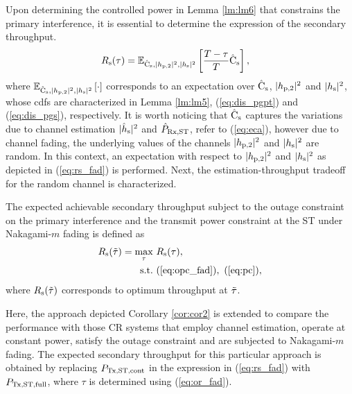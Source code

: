 Upon determining the controlled power in Lemma \ref{lm:lm6} that constrains the primary interference, it is essential to determine the expression of the secondary throughput.
\begin{align}
R_{\text{s}}(\tau) &= {\mathbb E}_{\hat{\text{{C}}}_{\text{s}}, |h_{\text{p,2}}|^2, |h_{\text{s}}|^2}\left[ \frac{T - \tau}{T} \hat{\text{{C}}}_{\text{s}}  \right], \label{eq:rs_fad} 
\end{align} 
where ${\mathbb E}_{\hat{\text{{C}}}_{\text{s}}, |h_{\text{p,2}}|^2, |h_{\text{s}}|^2}\left[ \cdot \right]$ corresponds to an expectation over $\hat{\text{{C}}}_{\text{s}}$, $|h_{\text{p,2}}|^2$ and $|h_{\text{s}}|^2$, whose cdfs are characterized in Lemma \ref{lm:lm5}, (\ref{eq:dis_pgpt}) and (\ref{eq:dis_pgs}), respectively. It is worth noticing that $\hat{\text{{C}}}_{\text{s}}$ captures the variations due to channel estimation $|\hat{h}_{\text{s}}|^2$ and $\hat{P}_{\text{Rx,ST}}$, refer to (\ref{eq:eca}), however due to channel fading, the underlying values of the channels $|h_{\text{p,2}}|^2$ and $|h_{\text{s}}|^2$ are random. In this context, an expectation with respect to $|h_{\text{p,2}}|^2$ and $|h_{\text{s}}|^2$ as depicted in (\ref{eq:rs_fad}) is performed.
Next, the estimation-throughput tradeoff for the random channel is characterized. 
\begin{theorem} \label{th:th2}
\normalfont
The expected achievable secondary throughput subject to the outage constraint on the primary interference and the transmit power constraint at the ST under Nakagami-$m$ fading is defined as
\begin{align}
R_{\text{s}}(\tilde{\tau}) = \operatorname*{max}_{\tau}  & \text{      } {R_{\text{s}}(\tau)}, 
 \label{eq:sys_fad} \\
\text{s.t.} & \text{ } (\ref{eq:opc_fad}), \text{  } (\ref{eq:pc}), \nonumber 
 \end{align}
where $R_{\text{s}}(\tilde{\tau})$ corresponds to optimum throughput at $\tilde{\tau}$.  
\end{theorem}

\begin{coro} \label{cor:cor3}
\normalfont
Here, the approach depicted Corollary \ref{cor:cor2} is extended to compare the performance with those CR systems that employ channel estimation, operate at constant power, satisfy the outage constraint and are subjected to Nakagami-$m$ fading. The expected secondary throughput for this particular approach is obtained by replacing $P_{\text{Tx,ST,cont}}$ in the expression in (\ref{eq:rs_fad}) with $P_{\text{Tx,ST,full}}$, where $\tau$ is determined using (\ref{eq:or_fad}). 

\end{coro}
 
